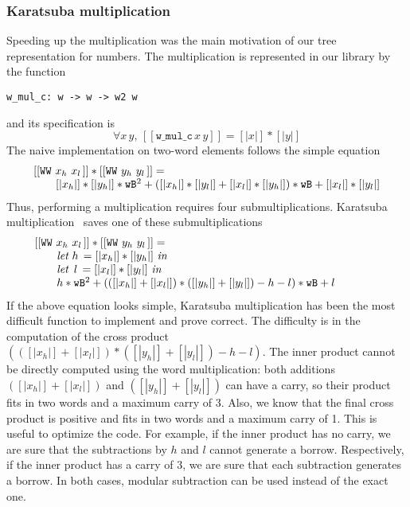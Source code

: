 \subsubsection{Karatsuba multiplication}
Speeding up the multiplication was the main motivation of our 
tree representation for numbers. The multiplication is represented in our library
by the function
\begin{verbatim}
w_mul_c: w -> w -> w2 w
\end{verbatim}
and its specification is
$$\forall x\, y,\, [[\texttt{w\_mul\_c}\, x\, y]] = [|x|] * [|y|]$$
The naive implementation on two-word elements follows the simple equation
$$\begin{array}{l}
[[\texttt{WW}\,\,x_h\,\,x_l\,]] * [[\texttt{WW}\,\,y_h\,\,y_l\,]] =\\
\hskip20pt [|{x_h}|] * [|{y_h}|] * {\texttt{wB}} ^ 2 +  ([|{x_h}|] * [|{y_l}|] + [|{x_l}|] * [|{y_h}|]) * {\texttt{wB}} + [|{x_l}|] * [|{y_l}|]
\end{array}
$$
Thus, performing a multiplication requires four submultiplications.
Karatsuba multiplication~\cite{Karat} saves one of these submultiplications
$$\begin{array}{l}
[[\texttt{WW}\,\,x_h\,\,x_l\,]] * [[\texttt{WW}\,\,y_h\,\,y_l\,]] = \\
\hskip20pt \textit{let}\,\, {h}\, = [|{x_h}|] * [|{y_h}|]\,\, \textit{in}\\
\hskip20pt \textit{let}\,\,\,  {l}\, = [|{x_l}|] * [|{y_l}|]\,\, \textit{in}\\
\hskip20pt {h} * {\texttt{wB}}^2 + (([|{x_h}|] + [|{x_l}|]) * ([|{y_h}|] + [|{y_l}|]) - {h} - {l}) * {\texttt{wB}} + {l} \qquad\qquad
\end{array}
$$
If the above equation looks simple,  Karatsuba multiplication has been the most difficult function 
to implement and prove correct.
The difficulty is in the computation of the cross
product $(([|{x_h}|] + [|{x_l}|]) * ([|{y_h}|] + [|{y_l}|]) - {h} - {l})$. 
The inner product cannot be directly computed using the word multiplication: 
both additions $([|{x_h}|] + [|{x_l}|])$ and $([|{y_h}|] + [|{y_l}|])$ can have a carry, 
so their product fits in two words and a maximum carry of 3.
Also, we know that the final cross product is positive and fits in
two words and a maximum carry of 1. This is useful to optimize the code.
For example, 
if the inner product has no carry, we are sure that the subtractions 
by $h$ and $l$ cannot generate a borrow. Respectively, 
if the inner product has a carry of 3,  we are sure that each 
subtraction generates a borrow. In both cases, modular subtraction can 
be used instead of the exact one. 

